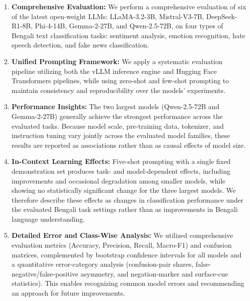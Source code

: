 \documentclass[10pt,letterpaper]{article}
\begin{document}
\begin{enumerate}
    \item \textbf{Comprehensive Evaluation:} We perform a comprehensive evaluation of six of the latest open-weight LLMs: LLaMA-3.2-3B, Mistral-V3-7B, DeepSeek-R1-8B, Phi-4-14B, Gemma-2-27B, and Qwen-2.5-72B, on four types of Bengali text classification tasks: sentiment analysis, emotion recognition, hate speech detection, and fake news classification.
    
    \item \textbf{Unified Prompting Framework:} We apply a systematic evaluation pipeline utilizing both the vLLM inference engine and Hugging Face Transformers pipelines, while using zero-shot and few-shot prompting to maintain consistency and reproducibility over the models' experiments.
    
    
    \item \textbf{Performance Insights:} The two largest models (Qwen-2.5-72B and Gemma-2-27B) generally achieve the strongest performance across the evaluated tasks. Because model scale, pre-training data, tokenizer, and instruction tuning vary jointly across the evaluated model families, these results are reported as associations rather than as causal effects of model size.
    
    \item \textbf{In-Context Learning Effects:} Five-shot prompting with a single fixed demonstration set produces task- and model-dependent effects, including improvements and occasional degradation among smaller models, while showing no statistically significant change for the three largest models. We therefore describe these effects as changes in classification performance under the evaluated Bengali task settings rather than as improvements in Bengali language understanding.
    
    \item \textbf{Detailed Error and Class-Wise Analysis:} We utilized comprehensive evaluation metrics (Accuracy, Precision, Recall, Macro-F1) and confusion matrices, complemented by bootstrap confidence intervals for all models and a quantitative error-category analysis (confusion-pair shares, false-negative/false-positive asymmetry, and negation-marker and surface-cue statistics). This enables recognizing common model errors and recommending an approach for future improvements.

\end{enumerate}
\end{document}
